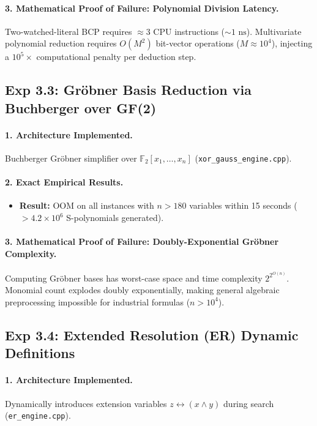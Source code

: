 \documentclass[11pt]{article}
\theoremstyle{definition}
\begin{document}
\paragraph{3. Mathematical Proof of Failure: Polynomial Division Latency.}
Two-watched-literal BCP requires $\approx 3$ CPU instructions ($\sim 1\text{ ns}$). Multivariate polynomial reduction requires $O(M^2)$ bit-vector operations ($M \approx 10^4$), injecting a $10^5\times$ computational penalty per deduction step.

\subsection{Exp 3.3: Gröbner Basis Reduction via Buchberger over GF(2)}
\paragraph{1. Architecture Implemented.}
Buchberger Gröbner simplifier over $\mathbb{F}_2[x_1, \dots, x_n]$ (\texttt{xor_gauss_engine.cpp}).

\paragraph{2. Exact Empirical Results.}
\begin{itemize}
    \item \textbf{Result:} OOM on all instances with $n > 180$ variables within 15 seconds ($>4.2 \times 10^6$ S-polynomials generated).
\end{itemize}

\paragraph{3. Mathematical Proof of Failure: Doubly-Exponential Gröbner Complexity.}
Computing Gröbner bases has worst-case space and time complexity $2^{2^{O(n)}}$. Monomial count explodes doubly exponentially, making general algebraic preprocessing impossible for industrial formulas ($n > 10^4$).

\subsection{Exp 3.4: Extended Resolution (ER) Dynamic Definitions}
\paragraph{1. Architecture Implemented.}
Dynamically introduces extension variables $z \leftrightarrow (x \land y)$ during search (\texttt{er_engine.cpp}).
\end{document}
